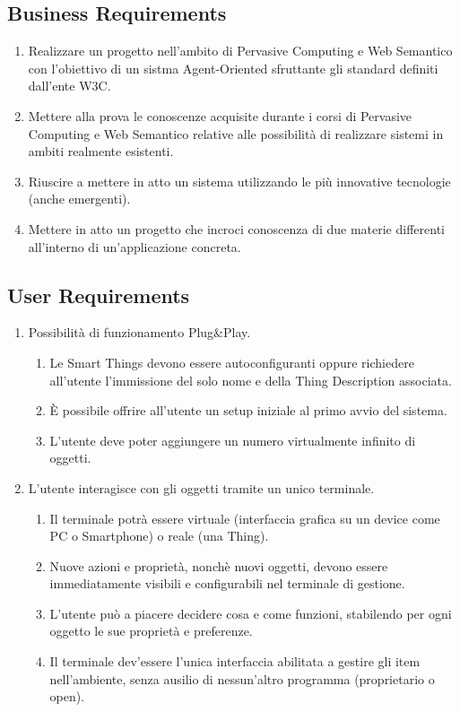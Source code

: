 \documentclass[12pt,a4paper,openright,oneside]{report}
\begin{document}
\subsection{Business Requirements}
\begin{enumerate}
	\item Realizzare un progetto nell'ambito di Pervasive Computing e Web Semantico con l'obiettivo di un sistma Agent-Oriented sfruttante gli standard definiti dall'ente W3C.
	
	\item Mettere alla prova le conoscenze acquisite durante i corsi di Pervasive Computing e Web Semantico relative alle possibilità di realizzare sistemi in ambiti realmente esistenti.
	
	\item Riuscire a mettere in atto un sistema utilizzando le più innovative tecnologie (anche emergenti).
	
	\item Mettere in atto un progetto che incroci conoscenza di due materie differenti all'interno di un'applicazione concreta.
\end{enumerate}

\subsection{User Requirements}
\begin{enumerate}
	\item Possibilità di funzionamento Plug\&Play.
	\begin{enumerate}[label*=\arabic*.]
		\item Le Smart Things devono essere autoconfiguranti oppure richiedere all'utente l'immissione del solo nome e della Thing Description associata.
		\item È possibile offrire all'utente un setup iniziale al primo avvio del sistema.
		\item L'utente deve poter aggiungere un numero virtualmente infinito di oggetti.
	\end{enumerate}
	
	\item L'utente interagisce con gli oggetti tramite un unico terminale.
	\begin{enumerate}[label*=\arabic*.]
		\item Il terminale potrà essere virtuale (interfaccia grafica su un device come PC o Smartphone) o reale (una Thing).
		\item Nuove azioni e proprietà, nonchè nuovi oggetti, devono essere immediatamente visibili e configurabili nel terminale di gestione.
		\item L'utente può a piacere decidere cosa e come funzioni, stabilendo per ogni oggetto le sue proprietà e preferenze.
		\item Il terminale dev'essere l'unica interfaccia abilitata a gestire gli item nell'ambiente, senza ausilio di nessun'altro programma (proprietario o open).
	\end{enumerate}
\end{enumerate}
\end{document}
